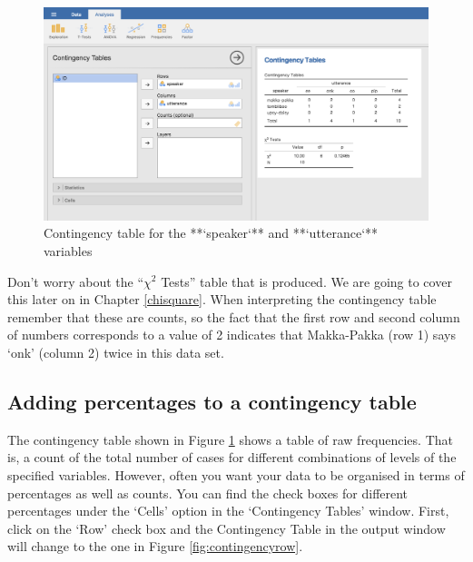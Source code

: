 \documentclass[
]{book}
\begin{document}
\begin{figure}

{\centering \includegraphics[width=1\linewidth]{img/mechanics/contingencytable} 

}

\caption{Contingency table for the **`speaker`** and **`utterance`** variables}\label{fig:contingencytable}
\end{figure}

Don't worry about the ``\(\chi^2\) Tests'' table that is produced. We are going to cover this later on in Chapter \ref{chisquare}. When interpreting the contingency table remember that these are counts, so the fact that the first row and second column of numbers corresponds to a value of 2 indicates that Makka-Pakka (row 1) says `onk' (column 2) twice in this data set.

\hypertarget{adding-percentages-to-a-contingency-table}{%
\subsection{Adding percentages to a contingency table}\label{adding-percentages-to-a-contingency-table}}

The contingency table shown in Figure \ref{fig:contingencytable} shows a table of raw frequencies. That is, a count of the total number of cases for different combinations of levels of the specified variables. However, often you want your data to be organised in terms of percentages as well as counts. You can find the check boxes for different percentages under the `Cells' option in the `Contingency Tables' window. First, click on the `Row' check box and the Contingency Table in the output window will change to the one in Figure \ref{fig:contingencyrow}.
\end{document}
